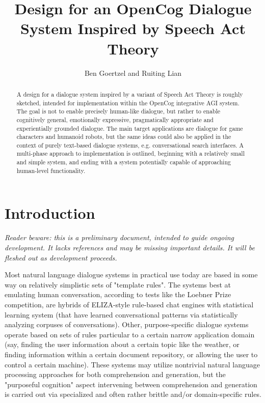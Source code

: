 \documentclass[10pt]{article}
\title{Design for an OpenCog Dialogue System Inspired by Speech Act Theory}
\author{Ben Goertzel and Ruiting Lian}
\begin{document}
\maketitle

\begin{abstract}
A design for a dialogue system inspired by a variant of Speech Act Theory is roughly sketched, intended for implementation within the OpenCog integrative AGI system.  The goal is not to enable precisely human-like dialogue, but rather to enable cognitively general, emotionally expressive, pragmatically appropriate and experientially grounded dialogue.  The main target applications are dialogue for game characters and humanoid robots, but the same ideas could also be applied in the context of purely text-based dialogue systems, e.g. conversational search interfaces. A multi-phase approach to implementation is outlined, beginning with a relatively small and simple system, and ending with a system potentially capable of approaching human-level functionality.
\end{abstract}

\section{Introduction}

{\it Reader beware: this is a preliminary document, intended to guide ongoing development.  It lacks references and may be missing important details.  It will be fleshed out as development proceeds.}

Most natural language dialogue systems in practical use today are based in some way on relatively simplistic sets of "template rules".   The systems best at emulating human conversation, according to tests like the Loebner Prize competition, are hybrids of ELIZA-style rule-based chat engines with statistical learning system (that have learned conversational patterns via statistically analyzing corpuses of conversations).   Other, purpose-specific dialogue systems operate based on sets of rules particular to a certain narrow application domain (say, finding the user information about a certain topic like the weather, or finding information within a certain document repository, or allowing the user to control a certain machine).  These systems may utilize nontrivial natural language processing approaches for both comprehension and generation, but the "purposeful cognition" aspect intervening between comprehension and generation is carried out via specialized and often rather brittle and/or domain-specific rules.
\end{document}
